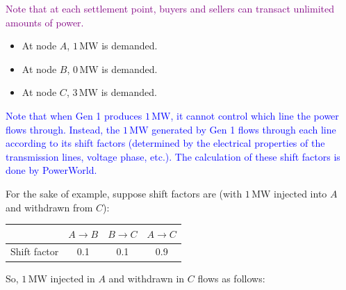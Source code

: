 \documentclass[11pt]{article}
\begin{document}
\textcolor{purple}{Note that at each settlement point, buyers and sellers can transact unlimited amounts of power.}

\begin{itemize}
  \item At node $A$, $1\,\mathrm{MW}$ is demanded.
  \item At node $B$, $0\,\mathrm{MW}$ is demanded.
  \item At node $C$, $3\,\mathrm{MW}$ is demanded.
\end{itemize}

\textcolor{blue}{Note that when Gen 1 produces $1\,\mathrm{MW}$, it cannot control which line the power flows through. Instead, the $1\,\mathrm{MW}$ generated by Gen 1 flows through each line according to its shift factors (determined by the electrical properties of the transmission lines, voltage phase, etc.). The calculation of these shift factors is done by PowerWorld.}

For the sake of example, suppose shift factors are (with $1\,\mathrm{MW}$ injected into $A$ and withdrawn from $C$):

\begin{center}
\begin{tabular}{lccc}
\toprule
 & $A\rightarrow B$ & $B\rightarrow C$ & $A\rightarrow C$ \\
\midrule
Shift factor & 0.1 & 0.1 & 0.9 \\
\bottomrule
\end{tabular}
\end{center}

So, $1\,\mathrm{MW}$ injected in $A$ and withdrawn in $C$ flows as follows:

\begin{center}
\end{center}
\end{document}
